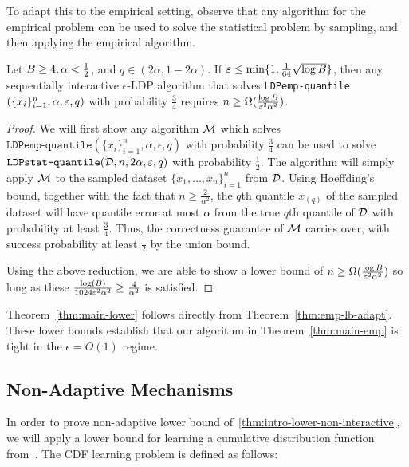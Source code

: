 To adapt this to the empirical setting, observe that any algorithm for the empirical problem can be used to solve the statistical problem by sampling, and then applying the empirical algorithm.
\begin{theorem}\label{thm:emp-lb-adapt}
    Let $B \geq 4,\alpha<\frac{1}{2}$, and $q \in (2\alpha, 1-2\alpha)$. If $\varepsilon \leq \min \{ 1, \frac{1}{64} \sqrt{\log B} \}$, then any sequentially interactive $\epsilon$-LDP algorithm that solves \texttt{LDPemp-quantile}$(\{x_i\}_{i=1}^n,\alpha,\varepsilon,q)$ with probability $\frac{3}{4}$ requires $n \geq \Omega(\frac{\log B}{\varepsilon^2 \alpha^2})$. 
\end{theorem}

\begin{proof}
    We will first show any algorithm $\mathcal{M}$ which solves $\texttt{LDPemp-quantile}(\{x_i\}_{i=1}^n, \alpha, \epsilon, q)$ with probability $\frac{3}{4}$ can be used to solve $\texttt{LDPstat-quantile}(\mathcal{D}, n, 2\alpha, \varepsilon, q)$ with probability $\frac{1}{2}$. The algorithm will simply apply $\mathcal{M}$ to the sampled dataset $\{x_1, \ldots, x_n\}_{i=1}^n$ from $\mathcal{D}$. Using Hoeffding's bound, together with the fact that $n \geq \frac{2}{\alpha^2}$, the $q$th quantile $x_{(q)}$ of the sampled dataset will have quantile error at most $\alpha$ from the true $q$th quantile of $\mathcal{D}$ with probability at least $\frac{3}{4}$. Thus, the correctness guarantee of $\mathcal{M}$ carries over, with success probability at least $\frac{1}{2}$ by the union bound.

    Using the above reduction, we are able to show a lower bound of $n \geq \Omega(\frac{\log B}{\varepsilon^2 \alpha^2})$ so long as these $\frac{\log(B)}{1024 \varepsilon^2 \alpha^2} \geq \frac{4}{\alpha^2}$ is satisfied.
    
\end{proof}

Theorem~\ref{thm:main-lower} follows directly from Theorem~\ref{thm:emp-lb-adapt}. These lower bounds establish that our algorithm in Theorem~\ref{thm:main-emp} is tight in the $\epsilon = O(1)$ regime.

\subsection{Non-Adaptive Mechanisms}
In order to prove non-adaptive lower bound of~\cref{thm:intro-lower-non-interactive}, we will apply a lower bound for learning a cumulative distribution function from~\cite{edmondsNU20}. The CDF learning problem is defined as follows:



